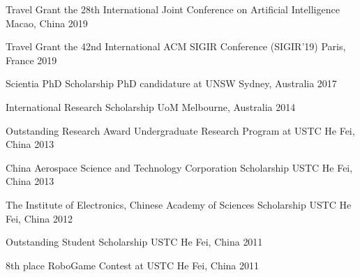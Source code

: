 
\begin{cvhonors}[top=-1mm]

\cvhonor
    {Travel Grant} %
    {the 28th International Joint Conference on Artificial Intelligence} %
    {Macao, China} %
    {2019} %

\cvhonor
  {Travel Grant}
  {the 42nd International ACM SIGIR Conference (SIGIR'19)}
  {Paris, France}
  {2019}

\cvhonor
  {Scientia PhD Scholarship}
  {PhD candidature at UNSW}
  {Sydney, Australia}
  {2017}

\cvhonor
  {International Research Scholarship}
  {UoM}
  {Melbourne, Australia}
  {2014}

\cvhonor
  {Outstanding Research Award}
  {Undergraduate Research Program at USTC}
  {He Fei, China}
  {2013}

\cvhonor
  {China Aerospace Science and Technology Corporation Scholarship}
  {USTC}
  {He Fei, China}
  {2013}

\cvhonor
  {The Institute of Electronics, Chinese Academy of Sciences Scholarship}
  {USTC}
  {He Fei, China}
  {2012}

\cvhonor
  {Outstanding Student Scholarship}
  {USTC}
  {He Fei, China}
  {2011}

\cvhonor
  {8th place}
  {RoboGame Contest at USTC}
  {He Fei, China}
  {2011}
\end{cvhonors}
